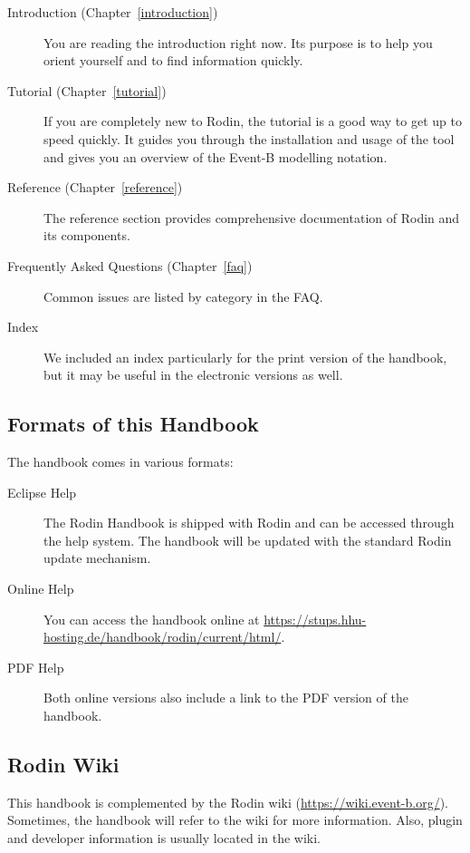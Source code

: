 \documentclass[twoside,10pt]{book}
\begin{document}
\begin{description}
	\item[Introduction (Chapter~\ref{introduction})] You are reading the introduction right now.  Its purpose is to help you orient yourself and to find information quickly.
	\item[Tutorial (Chapter~\ref{tutorial})] If you are completely new to Rodin, the tutorial is a good way to get up to speed quickly.  It guides you through the installation and usage of the tool and gives you an overview of the Event-B modelling notation.
	\item[Reference (Chapter~\ref{reference})] The reference section provides comprehensive documentation of Rodin and its components.
	\item[Frequently Asked Questions  (Chapter~\ref{faq})] Common issues are listed by category in the FAQ.
	\item[Index] We included an index particularly for the print version of the handbook, but it may be useful in the electronic versions as well.  
\end{description}

\subsection{Formats of this Handbook}
\label{handbook_formats}

The handbook comes in various formats:

\begin{description}
	\item[Eclipse Help] The Rodin Handbook is shipped with Rodin and can be accessed through the help system.  The handbook will be updated with the standard Rodin update mechanism.
	\item[Online Help] You can access the handbook online at \url{https://stups.hhu-hosting.de/handbook/rodin/current/html/}.
	\item[PDF Help] Both online versions also include a link to the PDF version of the handbook.
\end{description}

\subsection{Rodin Wiki}
\label{rodin_wiki}

This handbook is complemented by the Rodin wiki (\url{https://wiki.event-b.org/}).  Sometimes, the handbook will refer to the wiki for more information.  Also, plugin and developer information is usually located in the wiki.
\end{document}

